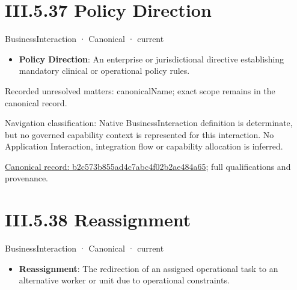 \section*{III.5.37 Policy Direction}
\label{navigation:III.5.37}

\label{element:b2c573b855ad4c7abc4f02b2ae484a65}
{\small BusinessInteraction · Canonical · current}\par

\begin{itemize}


\item \textbf{Policy Direction}: An enterprise or jurisdictional directive establishing mandatory clinical or operational policy rules.

\end{itemize}

{\small Recorded unresolved matters: canonicalName; exact scope remains in the canonical record.}\par
{\small Navigation classification: Native BusinessInteraction definition is determinate, but no governed capability context is represented for this interaction. No Application Interaction, integration flow or capability allocation is inferred.}\par
{\footnotesize \href{../../../../../../../../continuum/business/business-interaction/b2c573b855ad4c7abc4f02b2ae484a65.md}{Canonical record: b2c573b855ad4c7abc4f02b2ae484a65}; full qualifications and provenance.}\par
\section*{III.5.38 Reassignment}
\label{navigation:III.5.38}

\label{element:d4fb961b6148436686632668c98a6139}
{\small BusinessInteraction · Canonical · current}\par

\begin{itemize}


\item \textbf{Reassignment}: The redirection of an assigned operational task to an alternative worker or unit due to operational constraints.

\end{itemize}


